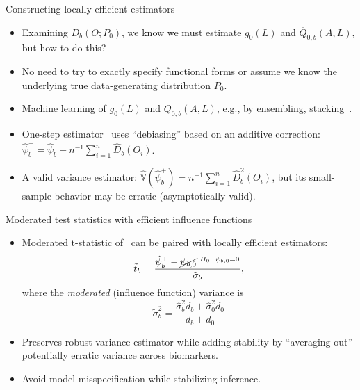 \documentclass{beamer}
\begin{document}
\begin{frame}[c]{Constructing locally efficient estimators}

\begin{center}
\begin{itemize}
  \itemsep6pt
  \item Examining $D_b(O; P_0)$, we know we must estimate $g_0(L)$ and
    $\overline{Q}_{0,b}(A,L)$, but how to do this?
  \item No need to try to exactly specify functional forms or assume we know the
    underlying true data-generating distribution $P_0$.
  \item Machine learning of $g_0(L)$ and $\overline{Q}_{0,b}(A,L)$, e.g., by
    ensembling, stacking~\citep{vdl2007super, breiman1996stacked}.
  \item One-step estimator~\citep{bickel1993efficient} uses ``debiasing'' based
    on an additive correction: $\hat{\psi}_{b}^{+} = \hat{\psi}_{b} + n^{-1}
     \sum_{i=1}^n \hat{D}_b(O_i)$.
  \item A valid variance estimator: $\hat{\mathbb{V}}(\hat{\psi}_b^{+}) =
    n^{-1} \sum_{i=1}^n \hat{D}_b^2(O_i)$, but its small-sample behavior may be
    erratic (asymptotically valid).
\end{itemize}
\end{center}

\end{frame}


\begin{frame}[c]{Moderated test statistics with efficient influence functions}

\begin{center}
\begin{itemize}
  \itemsep6pt
  \item Moderated t-statistic of~\cite{smyth2004linear} can be paired with
    locally efficient estimators:
    \begin{equation*}
      \tilde{t}_b = \frac{\hat{\psi}_b^{+} - \cancel{\psi_{b,0}}{~^{
      \scriptstyle H_0:~\psi_{b,0} = 0}}}
      {\tilde{\sigma}_b},
    \end{equation*}
    where the \textit{moderated} (influence function) variance is
    \begin{equation*}
      \tilde{\sigma}^2_b = \frac{\hat{\sigma}^2_b d_b + \hat{\sigma}^2_0 d_0}
      {d_b + d_0}
    \end{equation*}
  \item Preserves robust variance estimator while adding stability by
    ``averaging out'' potentially erratic variance across biomarkers.
  \item Avoid model misspecification while stabilizing inference.
\end{itemize}
\end{center}

\note{
}
\end{frame}
\end{document}
